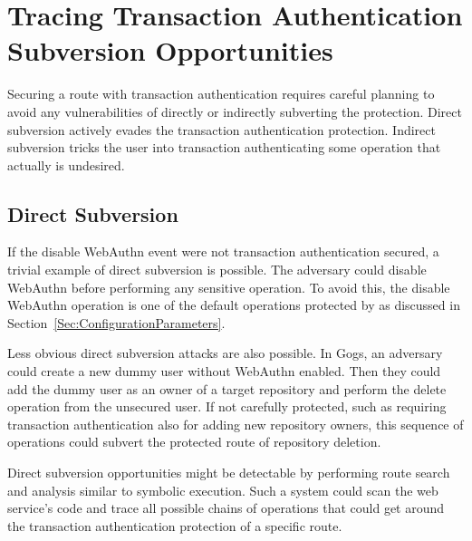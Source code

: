 


\section{Tracing Transaction Authentication \newline Subversion Opportunities}


Securing a route with transaction authentication requires careful planning to avoid any vulnerabilities of directly or indirectly subverting the protection. Direct subversion actively evades the transaction authentication protection. Indirect subversion tricks the user into transaction authenticating some operation that actually is undesired.

\subsection{Direct Subversion}
If the disable WebAuthn event were not transaction authentication secured, a trivial example of direct subversion is possible. The adversary could disable WebAuthn before performing any sensitive operation. To avoid this, the disable WebAuthn operation is one of the default operations protected by \sys{} as discussed in Section~\ref{Sec:ConfigurationParameters}.


Less obvious direct subversion attacks are also possible. In Gogs, an adversary could create a new dummy user without WebAuthn enabled. Then they could add the dummy user as an owner of a target repository and perform the delete operation from the unsecured user. If not carefully protected, such as requiring transaction authentication also for adding new repository owners, this sequence of operations could subvert the protected route of repository deletion.

Direct subversion opportunities might be detectable by performing route search and analysis similar to symbolic execution. Such a system could scan the web service's code and trace all possible chains of operations that could get around the transaction authentication protection of a specific route.

